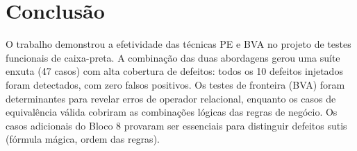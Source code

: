 \documentclass[conference, onecolumn]{IEEEtran}
\begin{document}
\section*{Conclusão}

O trabalho demonstrou a efetividade das técnicas PE e BVA no projeto de testes funcionais
de caixa-preta. A combinação das duas abordagens gerou uma suíte enxuta (47 casos) com
alta cobertura de defeitos: todos os 10 defeitos injetados foram detectados, com zero
falsos positivos. Os testes de fronteira (BVA) foram determinantes para revelar erros de
operador relacional, enquanto os casos de equivalência válida cobriram as combinações
lógicas das regras de negócio. Os casos adicionais do Bloco 8 provaram ser essenciais para
distinguir defeitos sutis (fórmula mágica, ordem das regras).
\end{document}
